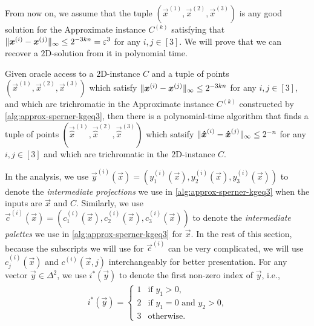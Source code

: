 From now on, we assume that the tuple $(\vec{x}^{(1)}, \vec{x}^{(2)}, \vec{x}^{(3)})$ is any good solution for the \outofk Approximate \Sperner instance $C^{(k)}$ satisfying that $\| {\boldsymbol{x}^{(i)}-\boldsymbol{x}^{(j)}} \|_{\infty}\leq 2^{-3kn}=\varepsilon^3$ for any $i,j\in [3]$. 
We will prove that we can recover a $2${\rm D}-\Sperner solution from it in polynomial time.
\begin{lemma}
    \label{lem:poly-time-recovery}
    Given oracle access to a $2${\rm D}-\Sperner instance $C$ and a tuple of points $(\vec{x}^{(1)}, \vec{x}^{(2)}, \vec{x}^{(3)})$ which satisfy $\| {\boldsymbol{x}^{(i)}-\boldsymbol{x}^{(j)}} \|_{\infty}\leq 2^{-3kn}$ for any $i,j\in [3]$, and which are trichromatic in the \outofk Approximate \Sperner instance $C^{(k)}$ constructed by \cref{alg:approx-sperner-kgeq3},
    then there is a polynomial-time algorithm that finds a tuple of points $(\vec{\hat{x}}^{(1)}, \vec{\hat{x}}^{(2)}, \vec{\hat{x}}^{(3)})$ which satsify $\| {\boldsymbol{\hat{x}}^{(i)}-\boldsymbol{\hat{x}}^{(j)}} \|_{\infty}\leq 2^{-n}$ for any $i,j\in [3]$ and which are trichromatic in the $2${\rm D}-\Sperner instance $C$.
\end{lemma}


In the analysis, 
we use $\vec{y}^{(i)}(\vec{x}) = (y^{(i)}_1(\vec{x}), y^{(i)}_2(\vec{x}), y^{(i)}_3(\vec{x}))$
to denote the {\em intermediate projections} we use in \cref{alg:approx-sperner-kgeq3} when the inputs are $\vec{x}$ and $C$. 
Similarly, we use
$\vec{c}^{(i)}(\vec{x}) = (c^{(i)}_1(\vec{x}), c^{(i)}_2(\vec{x}), c^{(i)}_3(\vec{x}))$ 
to denote the {\em intermediate palettes} we use in \cref{alg:approx-sperner-kgeq3} for $\vec{x}$.
In the rest of this section, because the subscripts we will use for $\vec{c}^{(i)}$ can be very complicated, we will use $c_j^{(i)}(\vec{x})$ and $c^{(i)}(\vec{x}, j)$ interchangeably for better presentation.
For any vector $\vec{y}\in \Delta^2$, we use $i^*(\vec{y})$ to denote the first non-zero index of $\vec{y}$, i.e., 
\begin{align}
    \label{eqn:first-nonzero-index}
    i^*(\vec{y}) = \begin{cases}
        1 & \text{if $y_1>0$,}\\
        2 & \text{if $y_1=0$ and $y_2>0$,}\\
        3 & \text{otherwise.}
    \end{cases}
\end{align}


